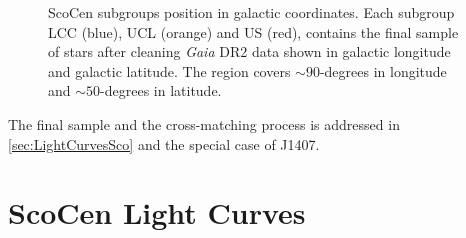 \begin{figure}[!ht]
\centering
\caption{\scriptsize{ScoCen subgroups position in galactic coordinates. Each subgroup LCC (blue), UCL (orange) and US (red), contains the final sample of stars after cleaning \textit{Gaia} DR2 data shown in galactic longitude and galactic latitude. The region covers $\sim 90$-degrees in longitude and $\sim 50$-degrees in latitude.}}
\label{fig:DR2_Projection}
\end{figure}

The final sample and the cross-matching process is addressed in \autoref{sec:LightCurvesSco} and the special case of J1407.


\section{ScoCen Light Curves}\label{sec:LightCurvesSco}

